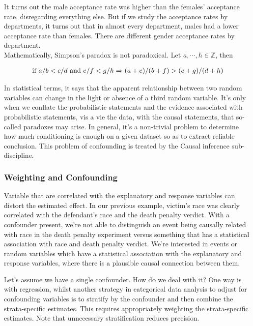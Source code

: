 \documentclass{homework}
\begin{document}
It turns out the male acceptance rate was higher than the females' acceptance rate, disregarding everything else. But if we study the acceptance rates by departments, it turns out that in almost every department, males had a lower acceptance rate than females. There are different gender acceptance rates by department. \\

Mathematically, Simpson's paradox is not paradoxical. Let $a,\cdots,h \in \mathds{Z}$, then 

\begin{align*}
   \textnormal{if } a/b < c/d \textnormal{ and } e/f < g/h \Rightarrow (a+e)/(b+f) > (c+g)/(d+h)
\end{align*}

In statistical terms, it says that the apparent relationship between two random variables can change in the light or absence of a third random variable. It's only when we conflate the probabilistic statements and the evidence associated with probabilistic statements, vis a vie the data, with the causal statements, that so-called paradoxes may arise. In general, it's a non-trivial problem to determine how much conditioning is enough on a given dataset so as to extract reliable conclusion. This problem of confounding is treated by the Causal inference sub-discipline.  

\subsubsection{Weighting and Confounding}

Variable that are correlated with the explanatory and response variables can distort the estimated effect. In our previous example, victim's race was clearly correlated with the defendant's race and the death penalty verdict. With a confounder present, we're not able to distinguish an event being causally related with race in the death penalty experiment versus something that has a statistical association with race and death penalty verdict. We're interested in events or random variables which have a statistical association with the explanatory and response variables, where there is a plausible causal connection between them. 

Let's assume we have a single confounder. How do we deal with it? One way is with regression, whilst another strategy in categorical data analysis to adjust for confounding variables is to stratify by the confounder and then combine the strata-specific estimates. This requires appropriately weighting the strata-specific estimates. Note that unnecessary stratification reduces precision. \\
\end{document}
